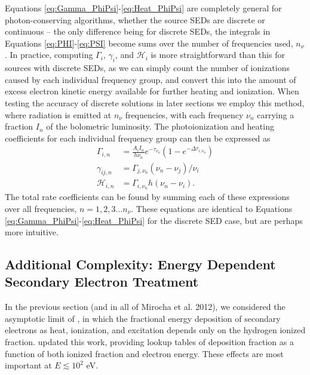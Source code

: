 \documentclass[letterpaper,titlepage,12pt]{article}
\numberwithin{equation}{section}
\newcommand{\Heat}{\mathcal{H}}
\begin{document}
Equations \ref{eq:Gamma_PhiPsi}-\ref{eq:Heat_PhiPsi} are completely general
for photon-conserving algorithms, whether the source SEDs are discrete or
continuous -- the only difference being for discrete SEDs, the integrals in
Equations \ref{eq:PHI}-\ref{eq:PSI} become sums over the number of frequencies
used, $n_{\nu}$. In practice, computing $\Gamma_i$, $\gamma_i$, and $\Heat_i$
is more straightforward than this for sources with discrete SEDs, as we can
simply count the number of ionizations caused by each individual frequency
group, and convert this into the amount of excess electron kinetic energy
available for further heating and ionization. When testing the accuracy of
discrete solutions in later sections we employ this method, where radiation is
emitted at $n_{\nu}$ frequencies, with each frequency $\nu_n$ carrying a
fraction $I_n$ of the bolometric luminosity. The photoionization and heating
coefficients for each individual frequency group can then be expressed as
\begin{align}
    \Gamma_{i,n} & = \frac{A_i I_n}{h \nu_n} e^{-\tau_{\nu_n}}(1 - e^{-\Delta \tau_{i,\nu_n}}) \label{eq:Gamma_simple}\\
    \gamma_{ij,n} & = \Gamma_{j,\nu_n} (\nu_n-\nu_j) / \nu_i \label{eq:gamma_simple} \\
    \Heat_{i,n} & = \Gamma_{i,\nu_n} h(\nu_n - \nu_i) \label{eq:Heat_simple}.
\end{align}    
The total rate coefficients can be found by summing each of these expressions
over all frequencies, $n=1,2,3...n_{\nu}$. These equations are identical to
Equations \ref{eq:Gamma_PhiPsi}-\ref{eq:Heat_PhiPsi} for the discrete SED
case, but are perhaps more intuitive.

\subsection{Additional Complexity: Energy Dependent Secondary Electron Treatment}
In the previous section (and in all of Mirocha et al. 2012), we considered the asymptotic limit of \citet{Shull1985}, in which the fractional energy deposition of secondary electrons as heat, ionization, and excitation depends only on the hydrogen ionized fraction.  \citet{Furlanetto2010} updated this work, providing lookup tables of deposition fraction as a function of both ionized fraction and electron energy.  These effects are most important at $E \lesssim 10^2$ eV.  
\end{document}
